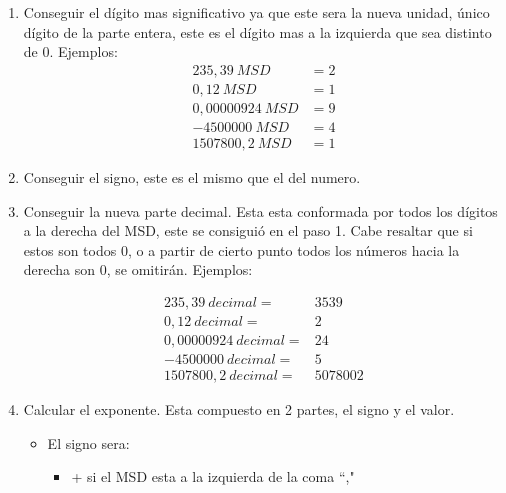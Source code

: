\documentclass[12pt]{article}
\newcommand{\comillas}[1]{``#1"}
\begin{document}
    \begin{enumerate}
        \item Conseguir el dígito mas significativo ya que este sera la nueva unidad,
            único dígito de la parte entera,
            este es el dígito mas a la izquierda que sea distinto de 0. Ejemplos:
            \begin{align*}
                235,39\ MSD&= 2\\
                0,12\ MSD&=1
                \\0,00000924\ MSD&=9
                \\ -4500000\ MSD &=4\\
                1507800,2\ MSD &=1
            \end{align*}



        \item Conseguir el signo, este es el mismo que el del numero.

        \item Conseguir la nueva parte decimal. Esta esta conformada por todos
            los dígitos a la derecha del MSD, este se consiguió en el paso 1.
            Cabe resaltar que si estos son todos 0, o a partir de cierto punto todos
            los números hacia la derecha son 0, se omitirán. Ejemplos:

            \begin{align*}
                235,39\ decimal= &3539\\ 0,12\ decimal=&2\\
                  0,00000924\ decimal=&24\\ -4500000\ decimal=&5\\1507800,2\ decimal=&5078002
            \end{align*}

        \item Calcular el exponente. Esta compuesto en 2 partes, el signo y el
            valor.
            \begin{itemize}
                \item El signo sera:
                    \begin{itemize}
                        \item + si el MSD esta a la izquierda de la coma \comillas{,}


\end{itemize}
\end{itemize}
\end{enumerate}
\end{document}
